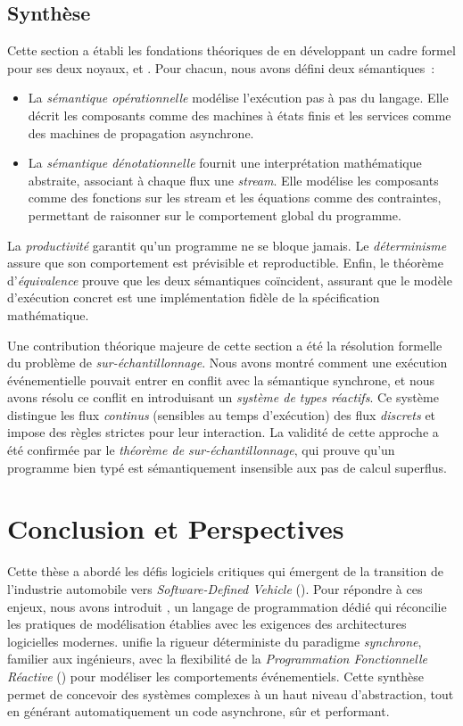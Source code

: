 \subsection{Synthèse}

Cette section a établi les fondations théoriques de \GRust en développant un cadre formel pour ses
deux noyaux, \GRSync et \GRFRP. Pour chacun, nous avons défini deux sémantiques~:
\begin{itemize}
      \item La \emph{sémantique opérationnelle} modélise l'exécution pas à pas du langage. Elle
            décrit les composants \GRSync comme des machines à états finis et les services \GRFRP
            comme des machines de propagation asynchrone.

      \item La \emph{sémantique dénotationnelle} fournit une interprétation mathématique abstraite,
            associant à chaque flux une \textit{stream}. Elle modélise les composants comme des
            fonctions sur les stream et les équations comme des contraintes, permettant de raisonner
            sur le comportement global du programme.
\end{itemize}
La \emph{productivité} garantit qu'un programme ne se bloque jamais. Le \emph{déterminisme} assure
que son comportement est prévisible et reproductible. Enfin, le théorème d'\emph{équivalence} prouve
que les deux sémantiques coïncident, assurant que le modèle d'exécution concret est une
implémentation fidèle de la spécification mathématique.

Une contribution théorique majeure de cette section a été la résolution formelle du problème de
\emph{sur-échantillonnage}. Nous avons montré comment une exécution événementielle pouvait entrer
en conflit avec la sémantique synchrone, et nous avons résolu ce conflit en introduisant un
\emph{système de types réactifs}. Ce système distingue les flux \emph{continus} (sensibles au
temps d'exécution) des flux \emph{discrets} et impose des règles strictes pour leur interaction.
La validité de cette approche a été confirmée par le \emph{théorème de sur-échantillonnage}, qui
prouve qu'un programme bien typé est sémantiquement insensible aux pas de calcul superflus.

\section{Conclusion et Perspectives}

Cette thèse a abordé les défis logiciels critiques qui émergent de la transition de l'industrie
automobile vers \emph{Software-Defined Vehicle} (\sdv). Pour répondre à ces enjeux, nous avons
introduit \GRust, un langage de programmation dédié qui réconcilie les pratiques de modélisation
établies avec les exigences des architectures logicielles modernes. \GRust unifie la rigueur
déterministe du paradigme \emph{synchrone}, familier aux ingénieurs, avec la flexibilité de la
\emph{Programmation Fonctionnelle Réactive} (\frp) pour modéliser les comportements événementiels.
Cette synthèse permet de concevoir des systèmes complexes à un haut niveau d'abstraction, tout en
générant automatiquement un code \Rust asynchrone, sûr et performant.

